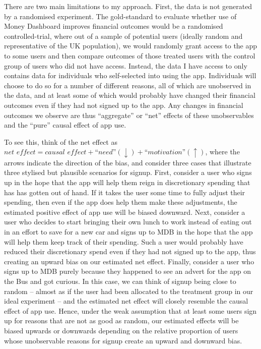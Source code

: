 There are two main limitations to my approach. First, the data is not
generated by a randomised experiment. The gold-standard to evaluate whether use
of Money Dashboard improves financial outcomes would be a randomised
controlled-trial, where out of a sample of potential users (ideally random and
representative of the UK population), we would randomly grant access to the app
to some users and then compare outcomes of those treated users with the control
group of users who did not have access. Instead, the data I have access to
only contains data for individuals who self-selected into using the app.
Individuals will choose to do so for a number of different reasons, all of
which are unobserved in the data, and at least some of which would probably
have changed their financial outcomes even if they had not signed up to the
app. Any changes in financial outcomes we observe are thus ``aggregate'' or
``net'' effects of these unobservables and the ``pure'' causal effect of app
use.

To see this, think of the net effect as $\textit{net effect} = \textit{causal
effect} + \textit{``need''}(\downarrow) + \textit{``motivation''}(\uparrow)$,
where the arrows indicate the direction of the bias, and consider three cases
that illustrate three stylised but plausible scenarios for signup. First,
consider a user who signs up in the hope that the app will help them reign in
discretionary spending that has has gotten out of hand. If it takes the user
some time to fully adjust their spending, then even if the app does help them
make these adjustments, the estimated positive effect of app use will be biased
downward. Next, consider a user who decides to start bringing their own lunch
to work instead of eating out in an effort to save for a new car and signs up
to MDB in the hope that the app will help them keep track of their spending.
Such a user would probably have reduced their discretionary spend even if they
had not signed up to the app, thus creating an upward bias on our estimated net
effect. Finally, consider a user who signs up to MDB purely because they
happened to see an advert for the app on the Bus and got curious. In this case,
we can think of signup being close to random -- almost as if the user had been
allocated to the treatment group in our ideal experiment -- and the estimated
net effect will closely resemble the causal effect of app use. Hence, under the
weak assumption that at least some users sign up for reasons that are not as
good as random, our estimated effects will be biased upwards or downwards
depending on the relative proportion of users whose unobservable reasons for
signup create an upward and downward bias.

